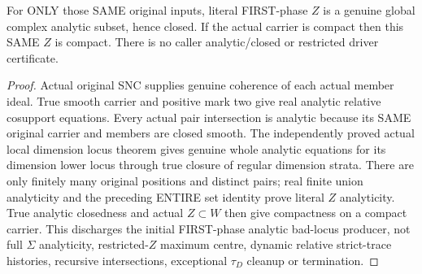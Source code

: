 \begin{theorem}
\label{hir:sharp-original-distinct-defect-actual-global-analytic-closed}
\leanok
For ONLY those SAME original inputs, literal FIRST-phase $Z$ is a genuine
global complex analytic subset, hence closed. If the actual carrier is
compact then this SAME $Z$ is compact. There is no caller analytic/closed or
restricted driver certificate.
\end{theorem}
\begin{proof}
Actual original SNC supplies genuine coherence of each actual member ideal.
True smooth carrier and positive mark two give real analytic relative
cosupport equations. Every actual pair intersection is analytic because its
SAME original carrier and members are closed smooth. The independently proved
actual local dimension locus theorem gives genuine whole analytic equations
for its dimension lower locus through true closure of regular dimension
strata. There are only finitely many original positions and distinct pairs;
real finite union analyticity and the preceding ENTIRE set identity prove
literal $Z$ analyticity. True analytic closedness and actual $Z\subset W$
then give compactness on a compact carrier. This discharges the initial
FIRST-phase analytic bad-locus producer, not full $\Sigma$ analyticity,
restricted-$Z$ maximum centre, dynamic relative strict-trace histories,
recursive intersections, exceptional $\tau_D$ cleanup or termination.
\end{proof}
